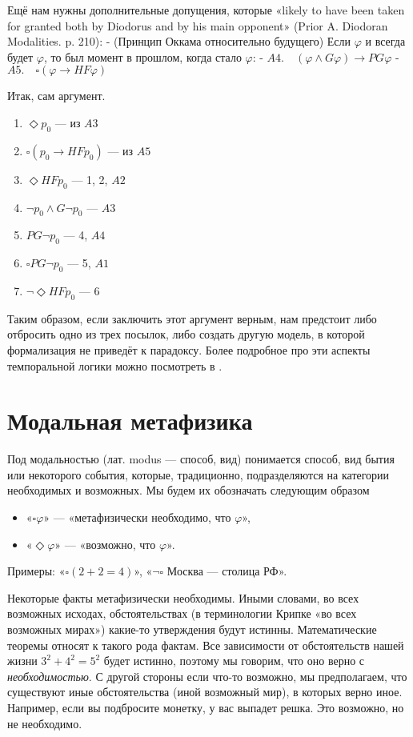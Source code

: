 \documentclass[openany]{book}
\theoremstyle{plain}
\theoremstyle{definition}
\begin{document}
Ещё нам нужны дополнительные допущения, которые «likely to have been taken for granted both by Diodorus and by his main opponent» (Prior A. Diodoran Modalities. p. 210):
- (Принцип Оккама относительно будущего) Если \(\varphi\) и всегда будет \(\varphi\), то был момент в прошлом, когда стало \(\varphi\):
- \(A4. \quad (\varphi \land G \varphi) \to PG\varphi\) 
- \(A5. \quad \square(\varphi \to HF \varphi)\)

Итак, сам аргумент.
\begin{enumerate}
    \item \(\Diamond p_0\) — из \(A3\)
    \item \(\square(p_0 \to HF p_0)\) — из \(A5\)
    \item \(\Diamond HF p_0\) — 1, 2, \(A2\)
    \item \(\neg p_0 \land G \neg p_0\) — \(A3\)
    \item \(PG \neg p_0\) — 4, \(A4\)
    \item \(\square PG \neg p_0\) — 5, \(A1\)
    \item \(\neg \Diamond HF p_0\) — 6
\end{enumerate}

Таким образом, если заключить этот аргумент верным, нам предстоит либо отбросить одно из трех посылок, либо создать другую модель, в которой формализация не приведёт к парадоксу. Более подробное про эти аспекты темпоральной логики можно посмотреть в \cite{Goranko}.

\chapter{Модальная метафизика}

Под модальностью (лат. modus --- способ, вид) понимается способ, вид бытия или некоторого события, которые, традиционно, подразделяются на категории необходимых и возможных. Мы будем их обозначать следующим образом
\begin{itemize}
    \item «\(\square \varphi\)» — «метафизически необходимо, что \(\varphi\)»,
    \item «\(\Diamond \varphi\)» — «возможно, что \(\varphi\)».
\end{itemize}

Примеры: «\(\square (2+2=4)\)», «\(\neg \square\) Москва — столица РФ».

Некоторые факты метафизически необходимы. Иными словами, во всех возможных исходах, обстоятельствах (в терминологии Крипке «во всех возможных мирах») какие-то утверждения будут истинны. Математические теоремы относят к такого рода фактам. Все зависимости от обстоятельств нашей жизни \(3^2 + 4^2 = 5^2\) будет истинно, поэтому мы говорим, что оно верно с \textit{необходимостью}. С другой стороны если что-то возможно, мы предполагаем, что существуют иные обстоятельства (иной возможный мир), в которых верно иное. Например, если вы подбросите монетку, у вас выпадет решка. Это возможно, но не необходимо.
\end{document}
